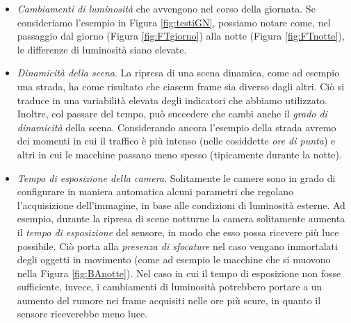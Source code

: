 \begin{itemize}
	\item \textit{Cambiamenti di luminosit\`a} che avvengono nel corso della giornata. 
	Se consideriamo l'esempio in Figura \ref{fig:testiGN}, possiamo notare come, nel passaggio dal giorno (Figura \ref{fig:FTgiorno}) alla notte (Figura \ref{fig:FTnotte}), le differenze di luminosit\`a siano elevate.  
	\item \textit{Dinamicit\`a della scena}. La ripresa di una scena dinamica, come ad esempio una strada, ha come risultato che ciascun frame sia diverso dagli altri.
	Ci\`o si traduce in una variabilit\`a elevata degli indicatori che abbiamo utilizzato. 
	Inoltre, col passare del tempo, pu\`o succedere che cambi anche il \textit{grado di dinamicit\`a} della scena.
	Considerando ancora l'esempio della strada avremo dei momenti in cui il traffico \`e pi\`u intenso (nelle cosiddette \textit{ore di punta}) e altri in cui le macchine passano meno spesso (tipicamente durante la notte).
	\item \textit{Tempo di esposizione della camera}. Solitamente le camere sono in grado di configurare in maniera automatica alcuni parametri che regolano l'acquisizione dell'immagine, in base alle condizioni di luminosit\`a esterne.
	Ad esempio, durante la ripresa di scene notturne la camera solitamente aumenta il \textit{tempo di esposizione} del sensore, in modo che esso possa ricevere pi\`u luce possibile.
	Ci\`o porta alla \textit{presenza di sfocature} nel caso vengano immortalati degli oggetti in movimento (come ad esempio le macchine che si muovono nella Figura \ref{fig:BAnotte}).
	Nel caso in cui il tempo di esposizione non fosse sufficiente, invece, i cambiamenti di luminosit\`a potrebbero portare a un aumento del rumore nei frame acquisiti nelle ore pi\`u scure, in quanto il sensore riceverebbe meno luce.
\end{itemize} 
